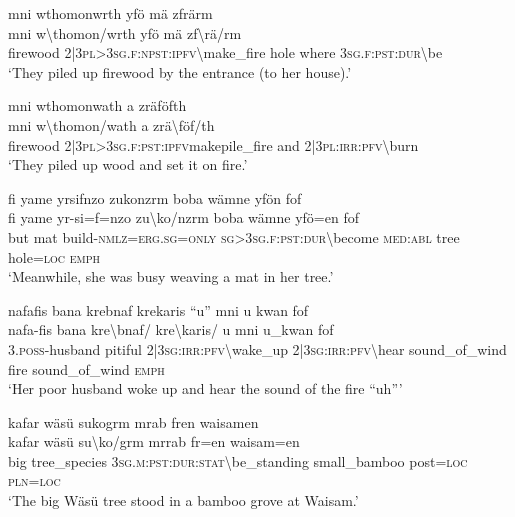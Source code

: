 \ea\label{ex:7:a4809}
mni wthomonwrth yfö mä zfrärm\\
\gll mni	w{\textbackslash}thomon/wrth	yfö	mä	zf{\textbackslash}rä/rm\\
     firewood	2|3\textsc{pl}>3\textsc{sg}.\textsc{f}:\textsc{npst}:\textsc{ipfv}{\textbackslash}make\_fire	hole	where	3\textsc{sg}.\textsc{f}:\textsc{pst}:\textsc{dur}{\textbackslash}be\\
\glt `They piled up firewood by the entrance (to her house).'
\z

\ea\label{ex:7:a4811}
mni wthomonwath a zräföfth\\
\gll mni	w{\textbackslash}thomon/wath	a	zrä{\textbackslash}föf/th\\
     firewood	2|3\textsc{pl}>3\textsc{sg}.\textsc{f}:\textsc{pst}:\textsc{ipfv}makepile\_fire	and	2|3\textsc{pl}:\textsc{irr}:\textsc{pfv}{\textbackslash}burn\\
\glt `They piled up wood and set it on fire.'
\z

\ea\label{ex:7:a4812}
fi yame yrsifnzo zukonzrm boba wämne yfön fof\\
\gll fi	yame	yr-si=f=nzo	zu{\textbackslash}ko/nzrm	boba	wämne	yfö=en	fof\\
     but	mat	build-\textsc{nmlz}=\textsc{erg}.\textsc{sg}=\textsc{only}	\textsc{sg}>3\textsc{sg}.\textsc{f}:\textsc{pst}:\textsc{dur}{\textbackslash}become	\textsc{med}:\textsc{abl}	tree	hole=\textsc{loc}	\textsc{emph}\\
\glt `Meanwhile, she was busy weaving a mat in her tree.'
\z

\ea\label{ex:7:a4813}
nafafis bana krebnaf krekaris ``u'' mni u kwan fof\\
\gll nafa-fis	bana	kre{\textbackslash}bnaf/	kre{\textbackslash}karis/	u	mni	u\_kwan	fof\\
     3.\textsc{poss}-husband	pitiful	2|3\textsc{sg}:\textsc{irr}:\textsc{pfv}{\textbackslash}wake\_up	2|3\textsc{sg}:\textsc{irr}:\textsc{pfv}{\textbackslash}hear	sound\_of\_wind	fire	sound\_of\_wind	\textsc{emph}\\
\glt `Her poor husband woke up and hear the sound of the fire ``uh'''
\z

\ea\label{ex:7:a4814}
kafar wäsü sukogrm mrab fren waisamen\\
\gll kafar	wäsü	su{\textbackslash}ko/grm	mrrab	fr=en	waisam=en\\
     big	tree\_species	3\textsc{sg}.\textsc{m}:\textsc{pst}:\textsc{dur}:\textsc{stat}{\textbackslash}be\_standing	small\_bamboo	post=\textsc{loc}	\textsc{pln}=\textsc{loc}\\
\glt `The big Wäsü tree stood in a bamboo grove at Waisam.'
\z

